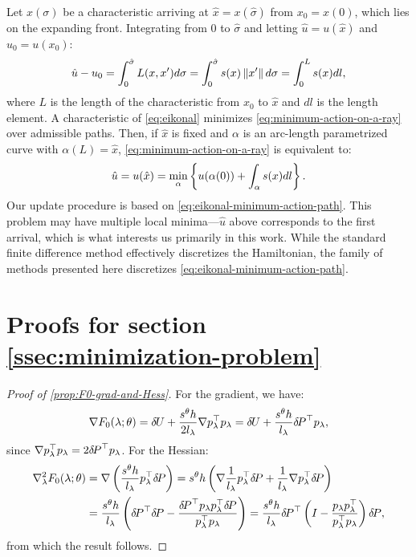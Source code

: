 \documentclass{article}
\begin{document}
Let $x(\sigma)$ be a characteristic arriving at
$\hat{x} = x(\hat\sigma)$ from $x_0 = x(0)$, which lies on the
expanding front. Integrating from $0$ to $\hat\sigma$ and letting
$\hat u = u(\hat x)$ and $u_0 = u(x_0)$:
\begin{equation}
  \label{eq:minimum-action-on-a-ray}
  \hat u - u_0 = \int_{0}^{\hat\sigma} L(x, x') d\sigma = \int_{0}^{\hat\sigma} s(x) \left\|x'\right\| d\sigma = \int_0^L s(x) dl,
\end{equation}
where $L$ is the length of the characteristic from $x_0$ to $\hat{x}$
and $dl$ is the length element. A characteristic of \cref{eq:eikonal}
minimizes \cref{eq:minimum-action-on-a-ray} over admissible
paths. Then, if $\hat{x}$ is fixed and $\alpha$ is an arc-length
parametrized curve with $\alpha(L) = \hat{x}$,
\cref{eq:minimum-action-on-a-ray} is equivalent to:
\begin{equation}\label{eq:eikonal-minimum-action-path}
  \hat{u} = u(\hat{x}) = \min_\alpha \left\{u(\alpha(0)) + \int_\alpha s(x) dl\right\}.
\end{equation}
Our update procedure is based on
\cref{eq:eikonal-minimum-action-path}. This problem may have multiple
local minima---$\hat{u}$ above corresponds to the first arrival, which
is what interests us primarily in this work. While the standard finite
difference method effectively discretizes the Hamiltonian, the family
of methods presented here discretizes
\cref{eq:eikonal-minimum-action-path}.

\section{Proofs for section
  \ref{ssec:minimization-problem}}\label{sec:minimization-proofs}

\begin{proof}[Proof of \cref{prop:F0-grad-and-Hess}]
  For the gradient, we have:
  \begin{equation*}
    \nabla F_0(\lambda; \theta) = {\delta \hspace{-0.09em} U} + \frac{s^{\theta} h}{2 l_\lambda} \nabla p_\lambda^\top p_\lambda = {\delta \hspace{-0.09em} U} + \frac{s^{\theta} h}{l_\lambda} {\delta \hspace{-0.14em} P}^\top p_\lambda,
  \end{equation*}
  since
  $\nabla p_\lambda^\top p_\lambda = 2 {\delta \hspace{-0.14em} P}^\top
  p_\lambda$. For the Hessian:
  \begin{align*}
    \nabla^2_\lambda F_0(\lambda; \theta) &= \nabla \left(\frac{s^{\theta} h}{l_\lambda} p_\lambda^\top {\delta \hspace{-0.14em} P}\right) = s^{\theta} h \left(\nabla \frac{1}{l_\lambda} p_\lambda^\top {\delta \hspace{-0.14em} P} + \frac{1}{l_\lambda} \nabla p_\lambda^\top {\delta \hspace{-0.14em} P}\right) \\
    &= \frac{s^{\theta} h}{l_\lambda} \left({\delta \hspace{-0.14em} P}^\top {\delta \hspace{-0.14em} P} - \frac{{\delta \hspace{-0.14em} P}^\top p_\lambda p_\lambda^\top {\delta \hspace{-0.14em} P}}{p_\lambda^\top p_\lambda}\right) = \frac{s^{\theta} h}{l_\lambda} {\delta \hspace{-0.14em} P}^\top \left(I - \frac{p_\lambda p_\lambda^\top}{p_\lambda^\top p_\lambda}\right) {\delta \hspace{-0.14em} P},
  \end{align*}
  from which the result follows.
\end{proof}
\end{document}
